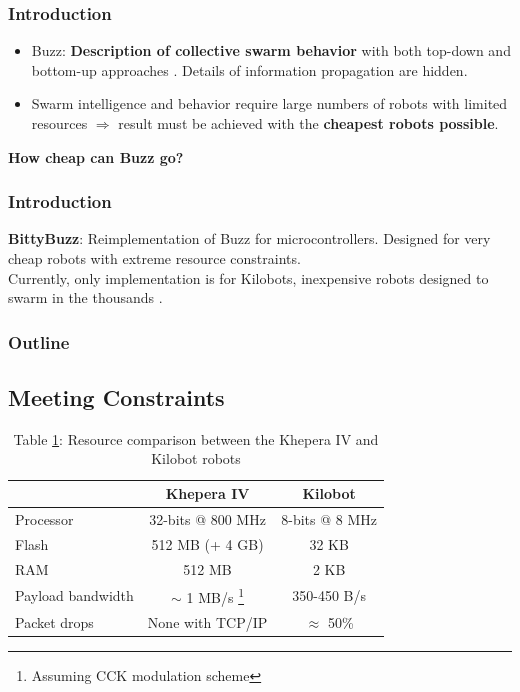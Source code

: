 \documentclass{beamer}
\begin{document}
	\begin{frame}
		\titlepage
	\end{frame}
	\begin{frame}
		\frametitle{Introduction}
		\begin{itemize}
			\item Buzz: \textbf{Description of collective swarm behavior} with both top-down and bottom-up approaches \cite{buzz_arxiv}. Details of information propagation are hidden.
			\item Swarm intelligence and behavior require large numbers of robots with limited resources $\Rightarrow$ result must be achieved with the \textbf{cheapest robots possible}.
		\end{itemize}

		\centering \Large
		\textbf{How cheap can Buzz go?}
	\end{frame}
	\begin{frame}
		\frametitle{Introduction}
		\textbf{BittyBuzz}: Reimplementation of Buzz for microcontrollers. Designed for very cheap robots with extreme resource constraints.\\
		Currently, only implementation is for Kilobots, inexpensive robots designed to swarm in the thousands \cite{kilobot_paper}.
	\end{frame}
	\begin{frame}
		\frametitle{Outline}
		\tableofcontents
	\end{frame}
	\begin{frame}
		\section{Meeting Constraints}
		\begin{table}
			\begin{tabular}{l|c|c}
				& Khepera IV        & Kilobot\\
				\hline
				Processor         & 32-bits @ 800 MHz & 8-bits @ 8 MHz\\
				Flash             & 512 MB (+ 4 GB)   & 32 KB\\
				RAM               & 512 MB            & 2 KB\\
				Payload bandwidth & $\sim$ 1 MB/s \footnote{Assuming CCK modulation scheme} \cite{khepera_wifi}  & 350-450 B/s\\
				Packet drops      & None with TCP/IP  & $\approx$ 50\%
			\end{tabular}
			\caption{
				\label{table:khepera kilobot comparison}Table \ref{table:khepera kilobot comparison}: Resource comparison between the Khepera IV and Kilobot robots \cite{khepera_specs}}
		\end{table}
	\end{frame}
\end{document}

